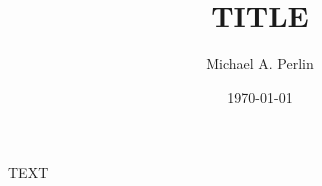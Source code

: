 \documentclass[nofootinbib,notitlepage,11pt]{revtex4-2}
\begin{document}
\thispagestyle{fancy}

\title{TITLE}%
\author{Michael A. Perlin}%
\date{\today}

\maketitle

TEXT
\end{document}
